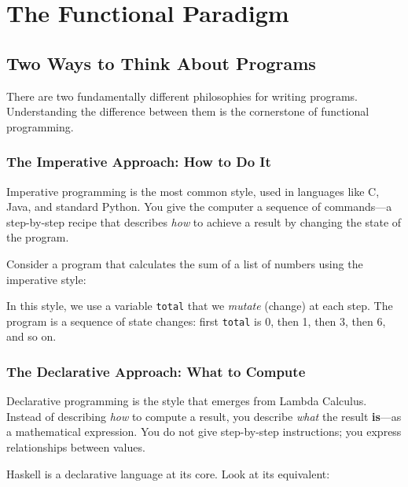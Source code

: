 \chapter{The Functional Paradigm}

\section{Two Ways to Think About Programs}

There are two fundamentally different philosophies for writing programs. Understanding the difference between them is the cornerstone of functional programming.

\subsection{The Imperative Approach: How to Do It}

Imperative programming is the most common style, used in languages like C, Java, and standard Python. You give the computer a sequence of commands---a step-by-step recipe that describes \textit{how} to achieve a result by changing the state of the program.

Consider a program that calculates the sum of a list of numbers using the imperative style:



In this style, we use a variable \texttt{total} that we \textit{mutate} (change) at each step. The program is a sequence of state changes: first \texttt{total} is 0, then 1, then 3, then 6, and so on.

\subsection{The Declarative Approach: What to Compute}

Declarative programming is the style that emerges from Lambda Calculus. Instead of describing \textit{how} to compute a result, you describe \textit{what} the result \textbf{is}---as a mathematical expression. You do not give step-by-step instructions; you express relationships between values.

Haskell is a declarative language at its core. Look at its equivalent:




